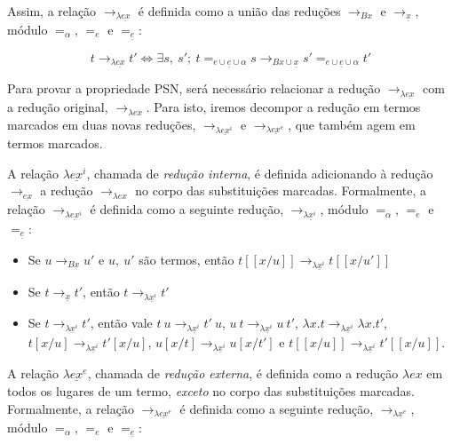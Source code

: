 Assim, a relação $\rightarrow_{\lambda \underline{ex}}$ é definida como a união
das reduções $\rightarrow_{Bx}$ e $\rightarrow_{\underline{x}}$, módulo
$=_{\alpha}$, $=_e$ e $=_{\underline{e}}$:

\[ t \rightarrow_{\lambda \underline{ex}} t' \iff \exists s,\ s';\ t =_{e \cup
        \underline{e} \cup \alpha} s \rightarrow_{Bx \cup \underline{x}} s' =_{e \cup
        \underline{e} \cup \alpha} t' \] 

Para provar a propriedade PSN, será necessário relacionar a redução
$\rightarrow_{\lambda \underline{ex}}$ com a redução original,
$\rightarrow_{\lambda ex}$. Para isto, iremos decompor a redução em termos
marcados em duas novas reduções, $\rightarrow_{\lambda \underline{ex}^i}$ e
$\rightarrow_{\lambda \underline{ex}^e}$, que também agem em termos marcados.

A relação $\lambda \underline{ex}^i$, chamada de \emph{redução interna}, é
definida adicionando à redução $\rightarrow_{\underline{ex}}$ a redução
$\rightarrow_{\lambda ex}$ no corpo das substituições marcadas.
Formalmente, a relação $\rightarrow_{\lambda \underline{ex}^i}$ é definida como a
seguinte redução, $\rightarrow_{\lambda \underline{x}^i}$, módulo $=_{\alpha}$,
$=_e$ e $=_{\underline{e}}$:

\begin{itemize}
    \item Se $u \rightarrow_{Bx} u'$ e $u,\ u'$ são termos, então $t[\![x/u]\!]
        \rightarrow_{\lambda \underline{x}^i} t[\![x/u']\!]$ 
    \item Se $t
        \rightarrow_{\underline{x}} t'$, então $t \rightarrow_{\lambda
            \underline{x}^i} t'$
    \item Se $t \rightarrow_{\lambda \underline{x}^i} t'$, então vale 
        $t\ u \rightarrow_{\lambda \underline{x}^i} t'\ u$,  
        $u\ t \rightarrow_{\lambda \underline{x}^i} u\ t'$, 
        $\lambda x. t \rightarrow_{\lambda \underline{x}^i} \lambda x. t'$, 
        $t[x/u] \rightarrow_{\lambda \underline{x}^i} t'[x/u]$, 
        $u[x/t] \rightarrow_{\lambda \underline{x}^i} u[x/t']$ e 
        $t[\![x/u]\!] \rightarrow_{\lambda \underline{x}^i} t'[\![x/u]\!]$.
\end{itemize}


A relação $\lambda \underline{ex}^e$, chamada de \emph{redução externa}, é
definida como a redução $\lambda ex$ em todos os lugares de um
termo, \emph{exceto} no corpo das substituições marcadas.
Formalmente, a relação $\rightarrow_{\lambda \underline{ex}^e}$ é definida como a
seguinte redução, $\rightarrow_{\lambda \underline{x}^e}$, módulo $=_{\alpha}$,
$=_e$ e $=_{\underline{e}}$:

